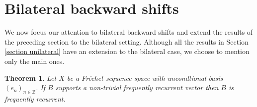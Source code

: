 \documentclass[11pt]{amsart}
\newtheorem{theorem}{Theorem}[section]
\begin{document}
\section{Bilateral backward shifts}\label{section:bilateral}
We now focus  our attention to bilateral backward shifts and extend the results of the preceding section to the bilateral setting. Although all the results in Section \ref{section unilateral} have an extension to the bilateral case, we choose to mention only the main ones.
\begin{theorem}\label{0-1 law frequent recurrence bil}
Let $X$ be a Fr\'echet sequence space with uncondtional basis $(e_n)_{n\in\mathbb Z}$. If $B$ supports a non-trivial frequently recurrent vector then $B$ is frequently recurrent.
\end{theorem}
\end{document}
